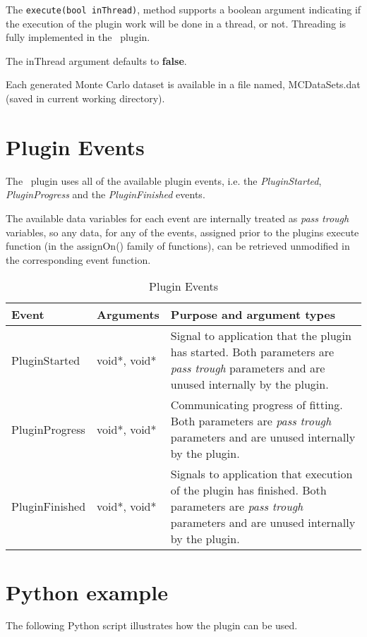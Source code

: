 The \verb|execute(bool inThread)|, method supports a boolean argument indicating if the execution of the plugin work will be done in a thread, or not. Threading is fully implemented in the \pname\ plugin.

The inThread argument defaults to \textbf{false}.

Each generated Monte Carlo dataset is available in a file named, MCDataSets.dat (saved in current working directory).


\section{Plugin Events}
The \pname\ plugin uses all of the available plugin events, i.e. the \emph{PluginStarted}, \emph{PluginProgress} and the \emph{PluginFinished} events.

The available data variables for each event are internally treated as \emph{pass trough} variables, so any data, for any of the events, assigned prior to
the plugins execute function (in the assignOn() family of functions), can be retrieved unmodified in the corresponding event function.

\begin{table}[ht]
\centering %
\begin{tabular}{l l p{9cm}}

Event & Arguments & Purpose and argument types \\ [0.5ex] %
\hline %
PluginStarted  	& 	void*, void*  & Signal to application that the plugin has started. Both parameters are \emph{pass trough} parameters and are unused internally by the plugin.\\[0.5ex]
PluginProgress	& 	void*, void*  & Communicating progress of fitting. Both parameters are \emph{pass trough} parameters and are unused internally by the plugin. \\[0.5ex]
PluginFinished	& 	void*, void*  & Signals to application that execution of the plugin has finished. Both parameters are \emph{pass trough} parameters and are unused internally by the plugin.\\

\hline %
\end{tabular}
\caption{Plugin Events}
\label{table:MCPluginEvents}
\end{table}

\section{Python example}
The following Python script illustrates how the plugin can be used.

